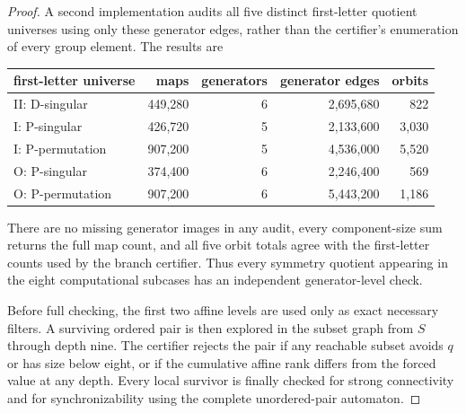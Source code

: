 \documentclass[11pt]{article}
\theoremstyle{definition}
\theoremstyle{remark}
\begin{document}
\begin{proof}
A second implementation audits all five distinct first-letter quotient universes using only these generator edges, rather than the certifier's enumeration of every group element. The results are
\begin{center}
\small
\begin{tabular}{lrrrr}
\toprule
first-letter universe & maps & generators & generator edges & orbits\\
\midrule
II: D-singular & 449,280 & 6 & 2,695,680 & 822\\
I: P-singular & 426,720 & 5 & 2,133,600 & 3,030\\
I: P-permutation & 907,200 & 5 & 4,536,000 & 5,520\\
O: P-singular & 374,400 & 6 & 2,246,400 & 569\\
O: P-permutation & 907,200 & 6 & 5,443,200 & 1,186\\
\bottomrule
\end{tabular}
\end{center}
There are no missing generator images in any audit, every component-size sum returns the full map count, and all five orbit totals agree with the first-letter counts used by the branch certifier. Thus every symmetry quotient appearing in the eight computational subcases has an independent generator-level check.

Before full checking, the first two affine levels are used only as exact necessary filters. A surviving ordered pair is then explored in the subset graph from $S$ through depth nine. The certifier rejects the pair if any reachable subset avoids $q$ or has size below eight, or if the cumulative affine rank differs from the forced value at any depth. Every local survivor is finally checked for strong connectivity and for synchronizability using the complete unordered-pair automaton.


\end{proof}
\end{document}
